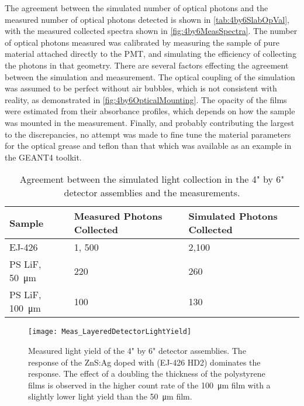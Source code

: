 The agreement between the simulated number of optical photons and the measured number of optical photons detected is shown in \autoref{tab:4by6SlabOpVal}, with the measured collected spectra shown in \autoref{fig:4by6MeasSpectra}.
The number of optical photons measured was calibrated by measuring the sample of pure material attached directly to the PMT, and simulating the efficiency of collecting the photons in that geometry.
There are several factors effecting the agreement between the simulation and measurement.
The optical coupling of the simulation was assumed to be perfect without air bubbles, which is not consistent with reality, as demonstrated in \autoref{fig:4by6OpticalMounting}.
The opacity of the films were estimated from their absorbance profiles, which depends on how the sample was mounted in the measurement.
Finally, and probably contributing the largest to the discrepancies, no attempt was made to fine tune the material parameters for the optical grease and teflon than that which was available as an example in the GEANT4 toolkit.
\begin{table}
	\caption[Agreement between Simulated and Measured Photon Collection in 4" by 6" Slabs]{Agreement between the simulated light collection in the 4" by 6" detector assemblies and the measurements.}
	\label{tab:4by6SlabOpVal}
	\begin{tabular}{m{3.5cm} m{4cm} m{4cm}}
	\toprule
	Sample & Measured Photons Collected & Simulated Photons Collected \\
	\midrule
	EJ-426 & 1, 500 & 2,100 \\
	PS LiF, \SI{50}{\um} & 220 & 260 \\
	PS LiF, \SI{100}{\um} & 100 & 130 \\
	\bottomrule
	\end{tabular}
\end{table}
\begin{figure}
	\centering
	\texttt{[image: Meas\_LayeredDetectorLightYield]}
	\caption[Measured Light Yield of the 4" by 6" Assemblies]{Measured light yield of the 4" by 6" detector assemblies. The response of the ZnS:Ag doped with  (EJ-426 HD2) dominates the response.  The effect of a doubling the thickness of the polystyrene films is observed in the higher count rate of the \SI{100}{\um} film with a slightly lower light yield than the \SI{50}{\um} film.}
	\label{fig:4by6MeasSpectra}
\end{figure}
